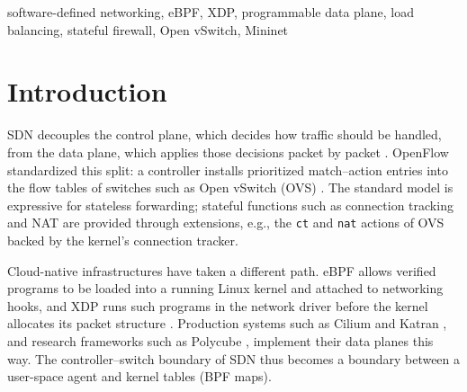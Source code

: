 \documentclass[conference]{IEEEtran}
\begin{document}
\begin{IEEEkeywords}
software-defined networking, eBPF, XDP, programmable data plane, load
balancing, stateful firewall, Open vSwitch, Mininet
\end{IEEEkeywords}

\section{Introduction}
SDN decouples the control plane, which decides how traffic should be handled,
from the data plane, which applies those decisions packet by packet
\cite{kreutz2015sdn,feamster2014road}. OpenFlow \cite{mckeown2008openflow}
standardized this split: a controller installs prioritized match--action
entries into the flow tables of switches such as Open vSwitch (OVS)
\cite{pfaff2015ovs}. The standard model is expressive for stateless
forwarding; stateful functions such as connection tracking and NAT are
provided through extensions, e.g., the \texttt{ct} and \texttt{nat} actions
of OVS backed by the kernel's connection tracker.

Cloud-native infrastructures have taken a different path. eBPF allows verified
programs to be loaded into a running Linux kernel and attached to networking
hooks, and XDP runs such programs in the network driver before the kernel
allocates its packet structure \cite{hoiland2018xdp,vieira2020ebpf}.
Production systems such as Cilium \cite{cilium} and Katran \cite{katran}, and
research frameworks such as Polycube \cite{miano2021polycube}, implement their
data planes this way. The controller--switch boundary of SDN thus becomes a
boundary between a user-space agent and kernel tables (BPF maps).
\end{document}
